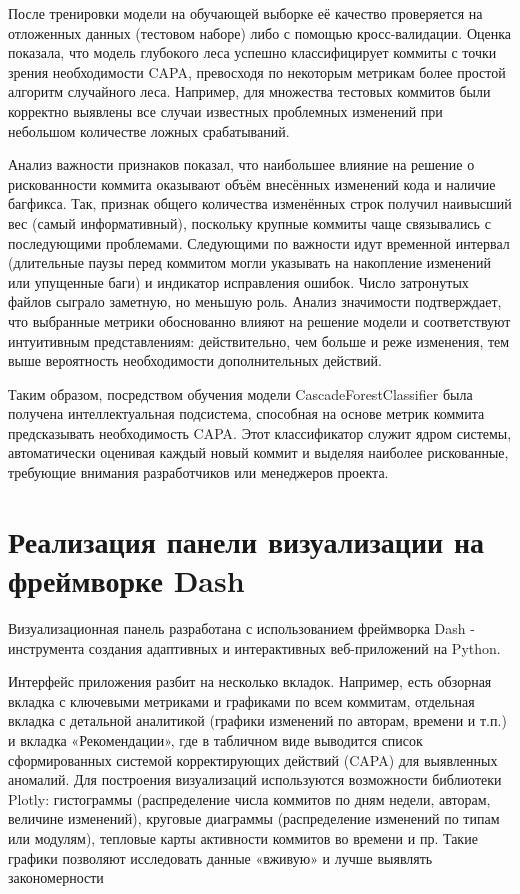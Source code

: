 После тренировки модели на обучающей выборке её качество проверяется на отложенных данных (тестовом наборе) либо с помощью кросс-валидации. Оценка показала, что модель глубокого леса успешно классифицирует коммиты с точки зрения необходимости CAPA, превосходя по некоторым метрикам более простой алгоритм случайного леса. Например, для множества тестовых коммитов были корректно выявлены все случаи известных проблемных изменений при небольшом количестве ложных срабатываний.

Анализ важности признаков показал, что наибольшее влияние на решение о рискованности коммита оказывают объём внесённых изменений кода и наличие багфикса. Так, признак общего количества изменённых строк получил наивысший вес (самый информативный), поскольку крупные коммиты чаще связывались с последующими проблемами. Следующими по важности идут временной интервал (длительные паузы перед коммитом могли указывать на накопление изменений или упущенные баги) и индикатор исправления ошибок. Число затронутых файлов сыграло заметную, но меньшую роль. Анализ значимости подтверждает, что выбранные метрики обоснованно влияют на решение модели и соответствуют интуитивным представлениям: действительно, чем больше и реже изменения, тем выше вероятность необходимости дополнительных действий.

Таким образом, посредством обучения модели CascadeForestClassifier была получена интеллектуальная подсистема, способная на основе метрик коммита предсказывать необходимость CAPA. Этот классификатор служит ядром системы, автоматически оценивая каждый новый коммит и выделяя наиболее рискованные, требующие внимания разработчиков или менеджеров проекта.

\section{Реализация панели визуализации на фреймворке Dash} \label{ch3:sec4}

Визуализационная панель разработана с использованием фреймворка Dash - инструмента создания адаптивных и интерактивных веб-приложений на Python.

Интерфейс приложения разбит на несколько вкладок. Например, есть обзорная вкладка с ключевыми метриками и графиками по всем коммитам, отдельная вкладка с детальной аналитикой (графики изменений по авторам, времени и т.п.) и вкладка «Рекомендации», где в табличном виде выводится список сформированных системой корректирующих действий (CAPA) для выявленных аномалий. Для построения визуализаций используются возможности библиотеки Plotly: гистограммы (распределение числа коммитов по дням недели, авторам, величине изменений), круговые диаграммы (распределение изменений по типам или модулям), тепловые карты активности коммитов во времени и пр. Такие графики позволяют исследовать данные «вживую» и лучше выявлять закономерности

